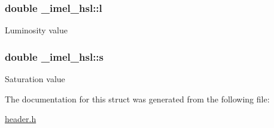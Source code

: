 \subsubsection[{\texorpdfstring{l}{l}}]{\setlength{\rightskip}{0pt plus 5cm}double \+\_\+imel\+\_\+hsl\+::l}\hypertarget{struct__imel__hsl_a228f9339990f23bf9731148c13f63a14}{}\label{struct__imel__hsl_a228f9339990f23bf9731148c13f63a14}
Luminosity value 
\subsubsection[{\texorpdfstring{s}{s}}]{\setlength{\rightskip}{0pt plus 5cm}double \+\_\+imel\+\_\+hsl\+::s}\hypertarget{struct__imel__hsl_a003fba43e90292648bc7b8095c5b2be3}{}\label{struct__imel__hsl_a003fba43e90292648bc7b8095c5b2be3}
Saturation value 

The documentation for this struct was generated from the following file\+:\begin{DoxyCompactItemize}
\item 
\hyperlink{header_8h}{header.\+h}\end{DoxyCompactItemize}
